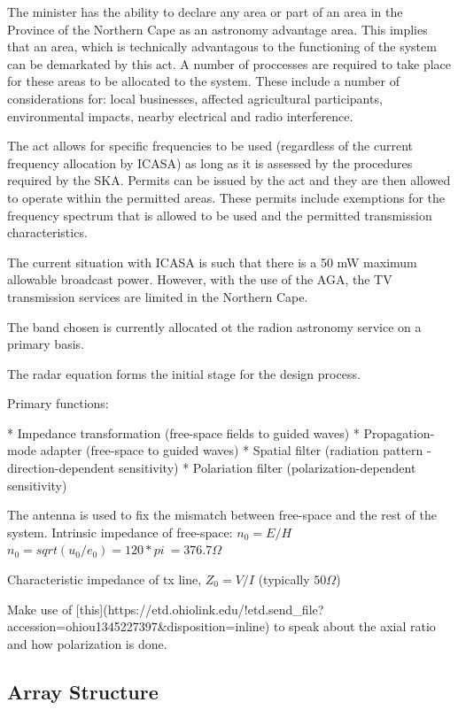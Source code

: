 \documentclass[11pt]{witseiepaper}
\begin{document}
The minister has the ability to declare any area or part of an area in the Province of the Northern Cape as an astronomy advantage area. This implies that an area, which is technically advantagous to the functioning of the system can be demarkated by this act.
A number of proccesses are required to take place for these areas to be allocated to the system. These include a number of considerations for: local businesses, affected agricultural participants, environmental impacts, nearby electrical and radio interference.

The act allows for specific frequencies to be used (regardless of the current frequency allocation by ICASA) as long as it is assessed by the procedures required by the SKA. Permits can be issued by the act and they are then allowed to operate within the permitted areas. These permits include exemptions for the frequency spectrum that is allowed to be used and the permitted transmission characteristics.

The current situation with ICASA is such that there is a 50 mW maximum allowable broadcast power. However, with the use of the AGA, the TV transmission services are limited in the Northern Cape.

The band chosen is currently allocated ot the radion astronomy service on a primary basis.








The radar equation forms the initial stage for the design process.

Primary functions:

    * Impedance transformation (free-space fields to guided waves)
    * Propagation-mode adapter (free-space to guided waves)
    * Spatial filter (radiation pattern - direction-dependent sensitivity)
    * Polariation filter (polarization-dependent sensitivity)

The antenna is used to fix the mismatch between free-space and the rest of the system.
Intrinsic impedance of free-space: $n_0 = E/H$
$n_0 = sqrt(u_0 / e_0) = 120 * pi ~= 376.7 \Omega$

Characteristic impedance of tx line, $Z_0 = V/I$ (typically $50 \Omega$)



Make use of [this](https://etd.ohiolink.edu/!etd.send\_file?accession=ohiou1345227397\&disposition=inline) to speak about the axial ratio and how polarization is done.

\subsection{Array Structure} \label{sec:ArrayStructure}
\end{document}
